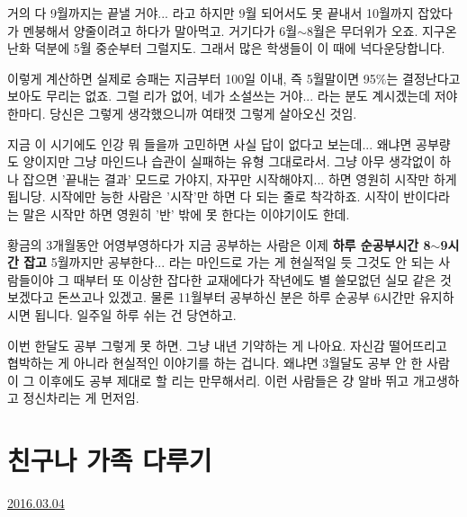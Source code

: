 거의 다 9월까지는 끝낼 거야... 라고 하지만 9월 되어서도 못 끝내서 10월까지 잡았다가 멘붕해서 양줄이려고 하다가 말아먹고.
거기다가 6월$\sim$8월은 무더위가 오죠. 지구온난화 덕분에 5월 중순부터 그럴지도.
그래서 많은 학생들이 이 때에 넉다운당합니다.
\vspace{5mm}

이렇게 계산하면 실제로 승패는 지금부터 100일 이내, 즉 5월말이면 95$\%$는 결정난다고 보아도 무리는 없죠.
그럴 리가 없어, 네가 소설쓰는 거야... 라는 분도 계시겠는데 저야 한마디. 당신은 그렇게 생각했으니까 여태껏 그렇게 살아오신 것임.
\vspace{5mm}

지금 이 시기에도 인강 뭐 들을까 고민하면 사실 답이 없다고 보는데... 왜냐면 공부량도 양이지만 그냥 마인드나 습관이 실패하는 유형 그대로라서.
그냥 아무 생각없이 하나 잡으면 '끝내는 결과' 모드로 가야지, 자꾸만 시작해야지... 하면 영원히 시작만 하게 됩니당.
시작에만 능한 사람은 '시작'만 하면 다 되는 줄로 착각하죠. 시작이 반이다라는 말은 시작만 하면 영원히 '반' 밖에 못 한다는 이야기이도 한데.
\vspace{5mm}

황금의 3개월동안 어영부영하다가 지금 공부하는 사람은 이제 \textbf{하루 순공부시간 8$\sim$9시간 잡고} 5월까지만 공부한다... 라는 마인드로 가는 게 현실적일 듯
그것도 안 되는 사람들이야 그 때부터 또 이상한 잡다한 교재에다가 작년에도 별 쓸모없던 실모 같은 것 보겠다고 돈쓰고나 있겠고.
물론 11월부터 공부하신 분은 하루 순공부 6시간만 유지하시면 됩니다. 일주일 하루 쉬는 건 당연하고.
\vspace{5mm}

이번 한달도 공부 그렇게 못 하면. 그냥 내년 기약하는 게 나아요. 자신감 떨어뜨리고 협박하는 게 아니라 현실적인 이야기를 하는 겁니다.
왜냐면 3월달도 공부 안 한 사람이 그 이후에도 공부 제대로 할 리는 만무해서리. 이런 사람들은 걍 알바 뛰고 개고생하고 정신차리는 게 먼저임.
\vspace{5mm}






\section{친구나 가족 다루기}
\href{https://www.kockoc.com/Apoc/663083}{2016.03.04}

